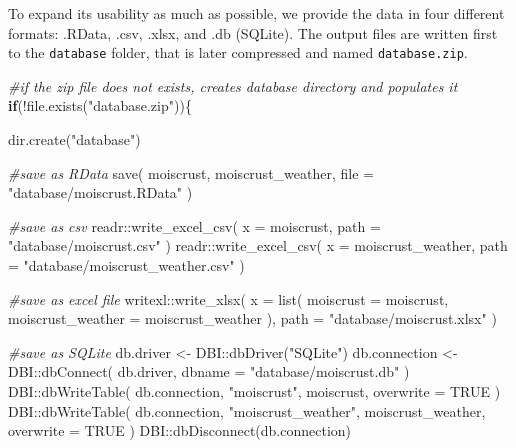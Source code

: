 \documentclass[
  table]{article}
\newenvironment{Shaded}{\begin{snugshade}}{\end{snugshade}}
\newcommand{\AttributeTok}[1]{\textcolor[rgb]{0.77,0.63,0.00}{#1}}
\newcommand{\CommentTok}[1]{\textcolor[rgb]{0.56,0.35,0.01}{\textit{#1}}}
\newcommand{\ConstantTok}[1]{\textcolor[rgb]{0.00,0.00,0.00}{#1}}
\newcommand{\ControlFlowTok}[1]{\textcolor[rgb]{0.13,0.29,0.53}{\textbf{#1}}}
\newcommand{\FunctionTok}[1]{\textcolor[rgb]{0.00,0.00,0.00}{#1}}
\newcommand{\NormalTok}[1]{#1}
\newcommand{\OtherTok}[1]{\textcolor[rgb]{0.56,0.35,0.01}{#1}}
\newcommand{\SpecialCharTok}[1]{\textcolor[rgb]{0.00,0.00,0.00}{#1}}
\newcommand{\StringTok}[1]{\textcolor[rgb]{0.31,0.60,0.02}{#1}}
\begin{document}
To expand its usability as much as possible, we provide the data in four
different formats: .RData, .csv, .xlsx, and .db (SQLite). The output
files are written first to the \texttt{database} folder, that is later
compressed and named \texttt{database.zip}.

\begin{Shaded}
\begin{Highlighting}[]
\CommentTok{\#if the zip file does not exists, creates database directory and populates it}
\ControlFlowTok{if}\NormalTok{(}\SpecialCharTok{!}\FunctionTok{file.exists}\NormalTok{(}\StringTok{"database.zip"}\NormalTok{))\{}
  
  \FunctionTok{dir.create}\NormalTok{(}\StringTok{"database"}\NormalTok{)}
  
  \CommentTok{\#save as RData}
  \FunctionTok{save}\NormalTok{(}
\NormalTok{    moiscrust, }
\NormalTok{    moiscrust\_weather,}
    \AttributeTok{file =} \StringTok{"database/moiscrust.RData"}
\NormalTok{  )}
  
  \CommentTok{\#save as csv}
\NormalTok{  readr}\SpecialCharTok{::}\FunctionTok{write\_excel\_csv}\NormalTok{(}
    \AttributeTok{x =}\NormalTok{ moiscrust,}
    \AttributeTok{path =} \StringTok{"database/moiscrust.csv"}
\NormalTok{  )}
\NormalTok{  readr}\SpecialCharTok{::}\FunctionTok{write\_excel\_csv}\NormalTok{(}
    \AttributeTok{x =}\NormalTok{ moiscrust\_weather,}
    \AttributeTok{path =} \StringTok{"database/moiscrust\_weather.csv"}
\NormalTok{  )}
  
  \CommentTok{\#save as excel file}
\NormalTok{  writexl}\SpecialCharTok{::}\FunctionTok{write\_xlsx}\NormalTok{(}
    \AttributeTok{x =} \FunctionTok{list}\NormalTok{(}
      \AttributeTok{moiscrust =}\NormalTok{ moiscrust,}
      \AttributeTok{moiscrust\_weather =}\NormalTok{ moiscrust\_weather}
\NormalTok{      ),}
    \AttributeTok{path =} \StringTok{"database/moiscrust.xlsx"}
\NormalTok{  )}
  
  \CommentTok{\#save as SQLite}
\NormalTok{  db.driver }\OtherTok{\textless{}{-}}\NormalTok{ DBI}\SpecialCharTok{::}\FunctionTok{dbDriver}\NormalTok{(}\StringTok{"SQLite"}\NormalTok{)}
\NormalTok{  db.connection }\OtherTok{\textless{}{-}}\NormalTok{ DBI}\SpecialCharTok{::}\FunctionTok{dbConnect}\NormalTok{(}
\NormalTok{    db.driver, }
    \AttributeTok{dbname =} \StringTok{"database/moiscrust.db"}
\NormalTok{    )}
\NormalTok{  DBI}\SpecialCharTok{::}\FunctionTok{dbWriteTable}\NormalTok{(}
\NormalTok{    db.connection, }
    \StringTok{"moiscrust"}\NormalTok{, }
\NormalTok{    moiscrust, }
    \AttributeTok{overwrite =} \ConstantTok{TRUE}
\NormalTok{    )}
\NormalTok{    DBI}\SpecialCharTok{::}\FunctionTok{dbWriteTable}\NormalTok{(}
\NormalTok{    db.connection, }
    \StringTok{"moiscrust\_weather"}\NormalTok{, }
\NormalTok{    moiscrust\_weather, }
    \AttributeTok{overwrite =} \ConstantTok{TRUE}
\NormalTok{    )}
\NormalTok{  DBI}\SpecialCharTok{::}\FunctionTok{dbDisconnect}\NormalTok{(db.connection)}
  

\end{Highlighting}
\end{Shaded}
\end{document}
